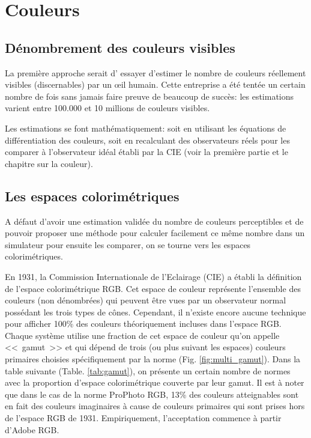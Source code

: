 	\section{Couleurs}
	\subsection{Dénombrement des couleurs visibles}	
	\par La première approche serait d' essayer d'estimer le nombre de couleurs réellement visibles (discernables) par un œil humain. Cette entreprise a été tentée un certain nombre de fois \citep{kuehni_how_2015, linhares_number_2008, perales_calculation_2008, pointer_gamut_1980, pointer_number_1998, wen_display_2006} sans jamais faire preuve de beaucoup de succès: les estimations varient entre 100.000 et 10 millions de couleurs visibles.
	
	\par Les estimations se font mathématiquement: soit en utilisant les équations de différentiation des couleurs, soit en recalculant des observateurs réels pour les comparer à l'observateur idéal établi par la CIE (voir la première partie et le chapitre sur la couleur).
	
	\subsection{Les espaces colorimétriques}
	\par A défaut d'avoir une estimation validée du nombre de couleurs perceptibles et de pouvoir proposer une méthode pour calculer facilement ce même nombre dans un simulateur pour ensuite les comparer, on se tourne vers les espaces colorimétriques.
	
	\par En 1931, la Commission Internationale de l'Eclairage (CIE) a établi la définition de l'espace colorimétrique RGB. Cet espace de couleur représente l'ensemble des couleurs (non dénombrées) qui peuvent être vues par un observateur normal possédant les trois types de cônes. Cependant, il n'existe encore aucune technique pour afficher 100\% des couleurs théoriquement incluses dans l'espace RGB. Chaque système utilise une fraction de cet espace de couleur qu'on appelle <<~gamut~>> et qui dépend de trois (ou plus suivant les espaces) couleurs primaires choisies spécifiquement par la norme (Fig. \ref{fig:multi_gamut}). Dans la table suivante (Table. \ref{tab:gamut}), on présente un certain nombre de normes avec la proportion d'espace colorimétrique couverte par leur gamut. Il est à noter que dans le cas de la norme ProPhoto RGB, 13\% des couleurs atteignables sont en fait des couleurs imaginaires à cause de couleurs primaires qui sont prises hors de l'espace RGB de 1931. Empiriquement, l'acceptation commence à partir d'Adobe RGB.

